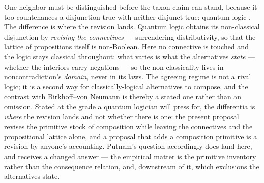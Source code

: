 \documentclass[11pt]{article}
\begin{document}
One neighbor must be distinguished before the taxon claim can stand, because it too countenances a disjunction true with neither disjunct true: quantum logic \parencite{birkhoffvonneumann1936, putnam1968}. The difference is where the revision lands. Quantum logic obtains its non-classical disjunction by \emph{revising the connectives} --- surrendering distributivity, so that the lattice of propositions itself is non-Boolean. Here no connective is touched and the logic stays classical throughout: what varies is what the alternatives \emph{state} --- whether the interiors carry negations --- so the non-classicality lives in noncontradiction's \emph{domain}, never in its laws. The agreeing regime is not a rival logic; it is a second way for classically-logical alternatives to compose, and the contrast with Birkhoff--von Neumann is thereby a stated one rather than an omission.
Stated at the grade a quantum logician will press for, the differentia is \emph{where} the revision lands and not whether there is one: the present proposal revises the primitive stock of composition while leaving the connectives and the propositional lattice alone, and a proposal that adds a composition primitive is a revision by anyone's accounting. Putnam's question accordingly does land here, and receives a changed answer --- the empirical matter is the primitive inventory rather than the consequence relation, and, downstream of it, which exclusions the alternatives state.
\end{document}
